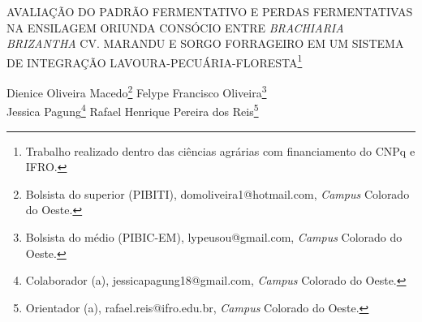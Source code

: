 \documentclass[article,12pt,onesidea,4paper,english,brazil]{abntex2}
\begin{document}
	
	
	\frenchspacing 
	
	\begin{center}
		\LARGE AVALIAÇÃO DO PADRÃO FERMENTATIVO E PERDAS FERMENTATIVAS NA ENSILAGEM ORIUNDA CONSÓCIO ENTRE \textit{BRACHIARIA BRIZANTHA} CV. MARANDU E SORGO FORRAGEIRO EM UM SISTEMA DE INTEGRAÇÃO LAVOURA-PECUÁRIA-FLORESTA\footnote{Trabalho realizado dentro das ciências agrárias com financiamento do CNPq e IFRO.}
		
		\normalsize
		Dienice Oliveira Macedo\footnote{Bolsista do superior (PIBITI), domoliveira1@hotmail.com, \textit{Campus} Colorado do Oeste.} 
		Felype Francisco Oliveira\footnote{Bolsista do médio (PIBIC-EM), lypeusou@gmail.com, \textit{Campus} Colorado do Oeste.} \\
		Jessica Pagung\footnote{Colaborador (a), jessicapagung18@gmail.com, \textit{Campus} Colorado do Oeste.} 
		Rafael Henrique Pereira dos Reis\footnote{Orientador (a), rafael.reis@ifro.edu.br, \textit{Campus} Colorado do Oeste.} 
	\end{center}
	
\end{document}
